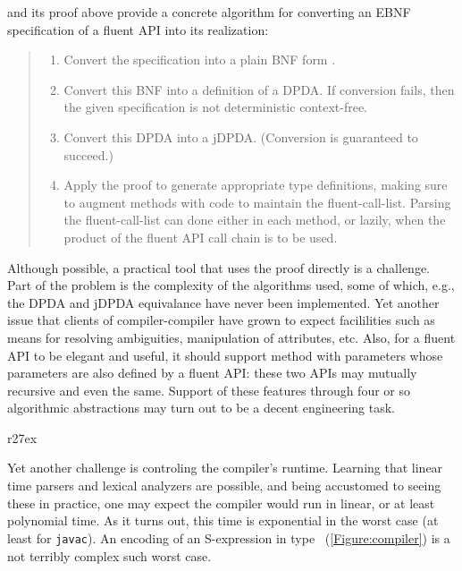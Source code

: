  and its proof above provide
  a concrete algorithm for converting an EBNF specification of a fluent API into
its realization:
\begin{quote}
  \begin{enumerate}
    \item Convert the specification into a plain BNF form
    .
    \item Convert this BNF into a definition of a DPDA. If conversion fails,
      then the given specification is not deterministic context-free.
    \item Convert this DPDA into a jDPDA. (Conversion is guaranteed to succeed.)
    \item Apply the proof to generate appropriate \Java type definitions, making sure to
        augment methods with code to maintain the fluent-call-list.
        Parsing the fluent-call-list can done either in each method,
        or lazily, when the product of the fluent API call chain is to
         be used.
  \end{enumerate}
\end{quote}
Although possible, a practical tool that uses the proof directly 
  is a challenge. 
Part of the problem is the complexity of the 
  algorithms used, some of which, e.g., the DPDA and jDPDA equivalance have never been 
  implemented.
Yet another issue that clients of compiler-compiler have grown to expect 
  facililities such as means for resolving ambiguities, manipulation 
  of attributes, etc.
Also, for a fluent API to be elegant and useful, 
  it should support method with parameters whose parameters are also defined by a  fluent API:
these two APIs may mutually recursive and even the same. 
Support of these features through four or so algorithmic abstractions 
  may turn out to be a decent engineering task.

\begin{wrapfigure}[6]r{27ex}
  \caption{\label{Figure:compiler} Encoding of an binary type tree}
\end{wrapfigure}
Yet another challenge is controling the compiler's  
  runtime.
Learning that linear time parsers and lexical analyzers are possible, 
  and being accustomed to seeing these in practice, one 
  may expect the compiler would run in linear, or at least polynomial time. 
As it turns out, this time is exponential in the worst case (at least for \texttt{javac}).
An encoding of an S-expression in type~ (\cref{Figure:compiler}) 
  is a not terribly complex such worst case.


